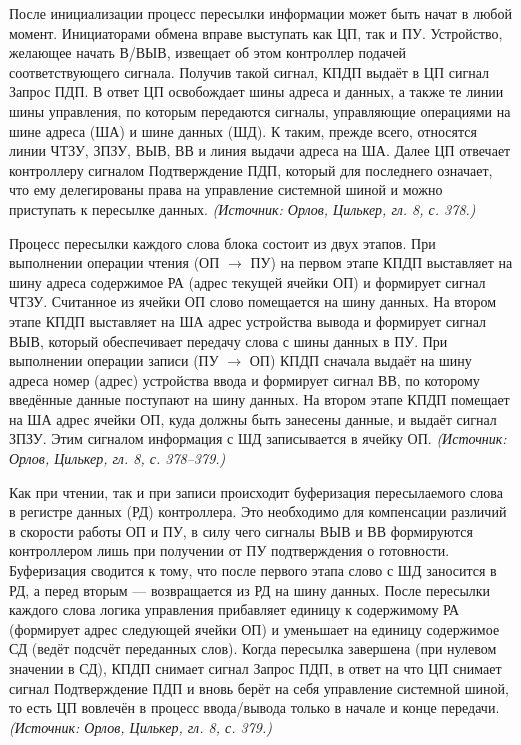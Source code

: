 \documentclass[a4paper,12pt]{article}
\begin{document}
После инициализации процесс пересылки информации может быть начат в любой момент. Инициаторами обмена вправе выступать как ЦП, так и ПУ. Устройство, желающее начать В/ВЫВ, извещает об этом контроллер подачей соответствующего сигнала. Получив такой сигнал, КПДП выдаёт в ЦП сигнал Запрос ПДП. В ответ ЦП освобождает шины адреса и данных, а также те линии шины управления, по которым передаются сигналы, управляющие операциями на шине адреса (ША) и шине данных (ШД). К таким, прежде всего, относятся линии ЧТЗУ, ЗПЗУ, ВЫВ, ВВ и линия выдачи адреса на ША. Далее ЦП отвечает контроллеру сигналом Подтверждение ПДП, который для последнего означает, что ему делегированы права на управление системной шиной и можно приступать к пересылке данных.
\textit{(Источник: Орлов, Цилькер, гл. 8, с. 378.)}

Процесс пересылки каждого слова блока состоит из двух этапов. При выполнении операции чтения (ОП \(\to\) ПУ) на первом этапе КПДП выставляет на шину адреса содержимое РА (адрес текущей ячейки ОП) и формирует сигнал ЧТЗУ. Считанное из ячейки ОП слово помещается на шину данных. На втором этапе КПДП выставляет на ША адрес устройства вывода и формирует сигнал ВЫВ, который обеспечивает передачу слова с шины данных в ПУ. При выполнении операции записи (ПУ \(\to\) ОП) КПДП сначала выдаёт на шину адреса номер (адрес) устройства ввода и формирует сигнал ВВ, по которому введённые данные поступают на шину данных. На втором этапе КПДП помещает на ША адрес ячейки ОП, куда должны быть занесены данные, и выдаёт сигнал ЗПЗУ. Этим сигналом информация с ШД записывается в ячейку ОП.
\textit{(Источник: Орлов, Цилькер, гл. 8, с. 378--379.)}

Как при чтении, так и при записи происходит буферизация пересылаемого слова в регистре данных (РД) контроллера. Это необходимо для компенсации различий в скорости работы ОП и ПУ, в силу чего сигналы ВЫВ и ВВ формируются контроллером лишь при получении от ПУ подтверждения о готовности. Буферизация сводится к тому, что после первого этапа слово с ШД заносится в РД, а перед вторым — возвращается из РД на шину данных. После пересылки каждого слова логика управления прибавляет единицу к содержимому РА (формирует адрес следующей ячейки ОП) и уменьшает на единицу содержимое СД (ведёт подсчёт переданных слов). Когда пересылка завершена (при нулевом значении в СД), КПДП снимает сигнал Запрос ПДП, в ответ на что ЦП снимает сигнал Подтверждение ПДП и вновь берёт на себя управление системной шиной, то есть ЦП вовлечён в процесс ввода/вывода только в начале и конце передачи.
\textit{(Источник: Орлов, Цилькер, гл. 8, с. 379.)}
\end{document}
